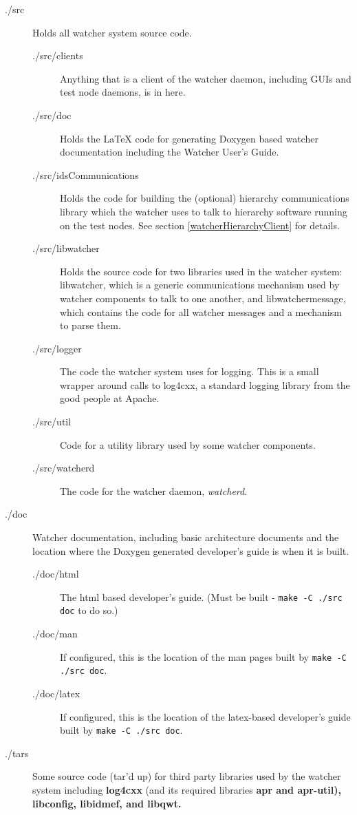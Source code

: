 \documentclass{article}
\begin{document}
\begin{description}
\item[.\slash src] Holds all watcher system source code. 
\begin{description}
\item[.\slash src\slash clients] Anything that is a client of the watcher daemon, including GUIs and test node daemons, is in here. 
\item[.\slash src\slash doc] Holds the \LaTeX{} code for generating Doxygen based watcher documentation including the Watcher User's Guide.
\item[.\slash src\slash idsCommunications] Holds the code for building the (optional) hierarchy communications library which the watcher uses to talk to hierarchy software running on the test nodes. 
See section \ref{watcherHierarchyClient} for details.
\item[.\slash src\slash libwatcher] Holds the source code for two libraries used in the watcher system: libwatcher, which is a generic communications mechanism used by watcher components
to talk to one another, and libwatchermessage, which contains the code for all watcher messages and a mechanism to parse them. 
\item[.\slash src\slash logger] The code the watcher system uses for logging. This is a small wrapper around calls to log4cxx, a standard logging library from the good people at Apache. 
\item[.\slash src\slash util] Code for a utility library used by some watcher components. 
\item[.\slash src\slash watcherd] The code for the watcher daemon, {\it watcherd}. 
\end{description}
\item[.\slash doc] Watcher documentation, including basic architecture documents and the location where the Doxygen generated developer's guide is when it is built. 
\begin{description}
\item[.\slash doc\slash html] The html based developer's guide. (Must be built - \vbox{{\tt make -C .\slash src doc}} to do so.)
\item[.\slash doc\slash man] If configured, this is the location of the man pages built by \vbox{{\tt make -C .\slash src doc}}.
\item[.\slash doc\slash latex] If configured, this is the location of the latex-based developer's guide built by 
\vbox{{\tt make -C ./src doc}}.
\end{description}
\item[.\slash tars] Some source code (tar'd up) for third party libraries used by the watcher system including {\bf log4cxx} (and its required libraries \bf{apr} and
\bf{apr-util}), \bf{libconfig}, \bf{libidmef}, and \bf{libqwt}. 
\end{description}
\end{document}
